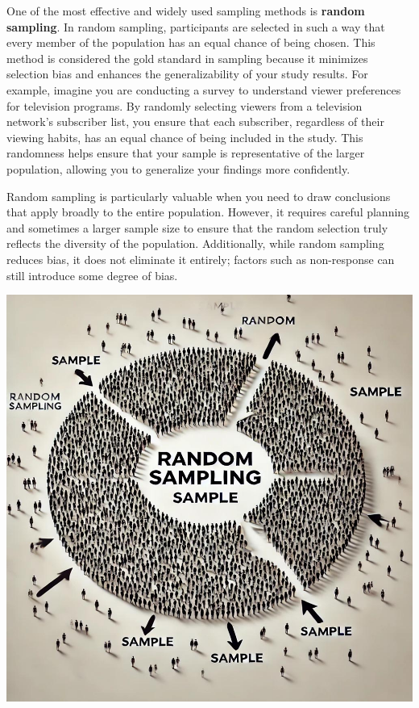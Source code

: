\documentclass[
]{book}
\begin{document}
One of the most effective and widely used sampling methods is \textbf{random sampling}. In random sampling, participants are selected in such a way that every member of the population has an equal chance of being chosen. This method is considered the gold standard in sampling because it minimizes selection bias and enhances the generalizability of your study results. For example, imagine you are conducting a survey to understand viewer preferences for television programs. By randomly selecting viewers from a television network's subscriber list, you ensure that each subscriber, regardless of their viewing habits, has an equal chance of being included in the study. This randomness helps ensure that your sample is representative of the larger population, allowing you to generalize your findings more confidently.

Random sampling is particularly valuable when you need to draw conclusions that apply broadly to the entire population. However, it requires careful planning and sometimes a larger sample size to ensure that the random selection truly reflects the diversity of the population. Additionally, while random sampling reduces bias, it does not eliminate it entirely; factors such as non-response can still introduce some degree of bias.

\includegraphics[width=1\linewidth,height=\textheight,keepaspectratio]{images/fig034.jpg}
\end{document}
